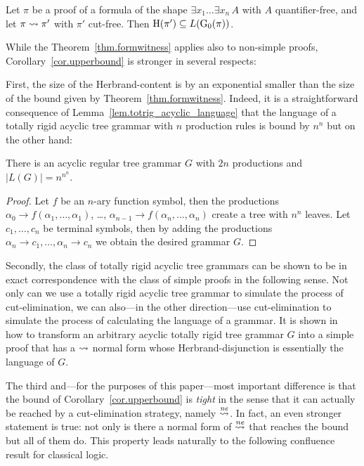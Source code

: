 \documentclass{LMCS}
\theoremstyle{plain}
\theoremstyle{definition}
\newcommand{\Lang}[1]{L(#1)}	\newcommand{\Gram}[1]{\mathrm{G}(#1)}	\newcommand{\Gramreg}[1]{\mathrm{G}_0(#1)}
\begin{document}
\begin{theorem}\label{thm.formwitness}
Let $\pi$ be a proof of a formula of the shape $\exists
x_1\ldots\exists x_n\, A$ with $A$ quantifier-free, and let $\pi\rightsquigarrow
\pi'$ with $\pi'$ cut-free. Then $\Hseq(\pi')\subseteq
\Lang{\Gramreg{\pi}}$.
\end{theorem}

While the Theorem~\ref{thm.formwitness} applies also to non-simple proofs,
Corollary~\ref{cor.upperbound} is stronger in several respects:

First, the size of the Herbrand-content is by an exponential smaller
than the size of the bound given by Theorem~\ref{thm.formwitness}.
Indeed, it is a straightforward consequence of
Lemma~\ref{lem.totrig_acyclic_language} that the language of a totally rigid
acyclic tree grammar with $n$ production rules is bound by $n^n$ but on
the other hand:

\begin{prop}
There is an acyclic regular tree grammar $G$ with $2n$ productions and $|\Lang{G}|=n^{n^{n}}$.
\end{prop}

\begin{proof}
Let $f$ be an $n$-ary function symbol, then the productions
$\alpha_0\rightarrow f(\alpha_1,\ldots,\alpha_1)$, \ldots, $\alpha_{n-1}\rightarrow f(\alpha_n,\ldots,\alpha_n)$
create a tree with $n^n$ leaves. Let $c_1,\ldots,c_n$ be terminal symbols, then by adding
the productions
$\alpha_n\rightarrow c_1,\ldots,\alpha_n\rightarrow c_n$
we obtain the desired grammar $G$.
\end{proof}

Secondly, the class of totally rigid acyclic tree grammars can be
shown to be in exact correspondence with the class of simple proofs in
the following sense.  Not only can we use a totally rigid acyclic tree
grammar to simulate the process of cut-elimination, we can also---in
the other direction---use cut-elimination to simulate the process of
calculating the language of a grammar. It is shown
in~\cite{Hetzl12Applying} how to transform an arbitrary acyclic
totally rigid tree grammar $G$ into a simple proof that has a $\rightsquigarrow$
normal form whose Herbrand-disjunction is essentially the language of
$G$.

The third and---for the purposes of this paper---most important
difference is that the bound of Corollary~\ref{cor.upperbound} is
{\em tight} in the sense that it can actually be reached by a cut-elimination
strategy, namely $\stackrel{\mathit{ne}}{\rightsquigarrow}$. In fact, an even stronger statement is true: not only is
there a normal form of $\stackrel{\mathit{ne}}{\rightsquigarrow}$ that reaches the bound but all of them do.
This property leads naturally to the following confluence result for
classical logic.
\end{document}
